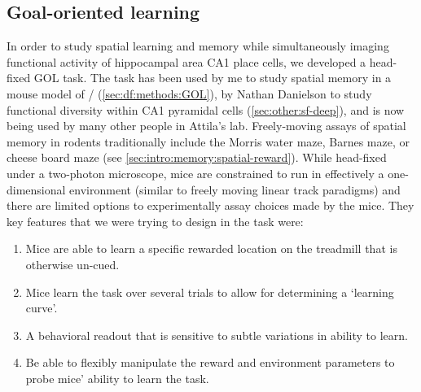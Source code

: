 \subsection{Goal-oriented learning}
\label{sec:intro:techniques:GOL}
In order to study spatial learning and memory while simultaneously imaging functional activity of hippocampal area CA1 place cells, we developed a head-fixed \acl{GOL} task. The task has been used by me to study spatial memory in a mouse model of \scz/ (\autoref{sec:df:methods:GOL}), by Nathan Danielson to study functional diversity within CA1 pyramidal cells (\autoref{sec:other:sf-deep}), and is now being used by many other people in Attila's lab.
Freely-moving assays of spatial memory in rodents traditionally include the Morris water maze, Barnes maze, or cheese board maze (see \autoref{sec:intro:memory:spatial-reward}).
While head-fixed under a two-photon microscope, mice are constrained to run in effectively a one-dimensional environment (similar to freely moving linear track paradigms) and there are limited options to experimentally assay choices made by the mice.
They key features that we were trying to design in the task were:
\begin{enumerate}
	\item Mice are able to learn a specific rewarded location on the treadmill that is otherwise un-cued.\label{item:into:techniques:GOL:location}
	\item Mice learn the task over several trials to allow for determining a `learning curve'.\label{item:into:techniques:GOL:learning}
	\item A behavioral readout that is sensitive to subtle variations in ability to learn.\label{item:into:techniques:GOL:readout}
	\item Be able to flexibly manipulate the reward and environment parameters to probe mice' ability to learn the task.\label{item:into:techniques:GOL:manip}
\end{enumerate}

